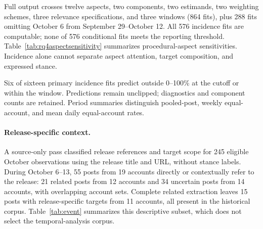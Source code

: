 \documentclass[sigconf,balance=false]{acmart}
\begin{document}
Full output crosses twelve aspects, two components, two estimands, two weighting schemes, three relevance specifications, and three windows (864 fits), plus 288 fits omitting October 6 from September 29--October 12. All 576 incidence fits are computable; none of 576 conditional fits meets the reporting threshold. Table~\ref{tab:rq4aspectsensitivity} summarizes procedural-aspect sensitivities. Incidence alone cannot separate aspect attention, target composition, and expressed stance.

Six of sixteen primary incidence fits predict outside 0--100\% at the cutoff or within the window. Predictions remain unclipped; diagnostics and component counts are retained. Period summaries distinguish pooled-post, weekly equal-account, and mean daily equal-account rates.

\paragraph{Release-specific context.}
A source-only pass classified release references and target scope for 245 eligible October observations using the release title and URL, without stance labels. During October 6--13, 55 posts from 19 accounts directly or contextually refer to the release: 21 related posts from 12 accounts and 34 uncertain posts from 14 accounts, with overlapping account sets. Complete related extraction leaves 15 posts with release-specific targets from 11 accounts, all present in the historical corpus. Table~\ref{tab:event} summarizes this descriptive subset, which does not select the temporal-analysis corpus.

\begin{table}[p]

\par\medskip

\par\medskip

\end{table}
\end{document}
